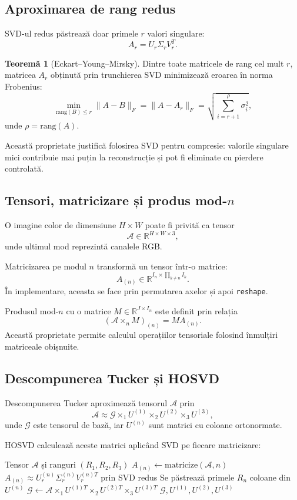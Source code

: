 \documentclass[12pt,a4paper]{article}
\theoremstyle{definition}
\newtheorem{teorema}{Teoremă}[section]
\begin{document}
\subsection{Aproximarea de rang redus}

SVD-ul redus păstrează doar primele $r$ valori singulare:
\[
  A_r = U_r \Sigma_r V_r^T.
\]

\begin{teorema}[Eckart--Young--Mirsky]
Dintre toate matricele de rang cel mult $r$, matricea $A_r$ obținută prin trunchierea SVD minimizează eroarea în norma Frobenius:
\[
  \min_{\mathrm{rang}(B)\le r}\|A-B\|_F
  =
  \|A-A_r\|_F
  =
  \sqrt{\sum_{i=r+1}^{\rho}\sigma_i^2},
\]
unde $\rho=\mathrm{rang}(A)$.
\end{teorema}

Această proprietate justifică folosirea SVD pentru compresie: valorile singulare mici contribuie mai puțin la reconstrucție și pot fi eliminate cu pierdere controlată.

\subsection{Tensori, matricizare și produs mod-$n$}

O imagine color de dimensiune $H \times W$ poate fi privită ca tensor
\[
  \mathcal{A} \in \mathbb{R}^{H \times W \times 3},
\]
unde ultimul mod reprezintă canalele RGB.

Matricizarea pe modul $n$ transformă un tensor într-o matrice:
\[
  A_{(n)} \in \mathbb{R}^{I_n \times \prod_{k\neq n} I_k}.
\]
În implementare, aceasta se face prin permutarea axelor și apoi \texttt{reshape}.

Produsul mod-$n$ cu o matrice $M \in \mathbb{R}^{J \times I_n}$ este definit prin relația
\[
  \left(\mathcal{A}\times_n M\right)_{(n)} = M A_{(n)}.
\]
Această proprietate permite calculul operațiilor tensoriale folosind înmulțiri matriceale obișnuite.

\subsection{Descompunerea Tucker și HOSVD}

Descompunerea Tucker aproximează tensorul $\mathcal{A}$ prin
\[
  \mathcal{A} \approx
  \mathcal{G}
  \times_1 U^{(1)}
  \times_2 U^{(2)}
  \times_3 U^{(3)},
\]
unde $\mathcal{G}$ este tensorul de bază, iar $U^{(n)}$ sunt matrici cu coloane ortonormate.

HOSVD calculează aceste matrici aplicând SVD pe fiecare matricizare:
\begin{algorithm}[H]
\caption{HOSVD}
\begin{algorithmic}[1]
\Require Tensor $\mathcal{A}$ și ranguri $(R_1,R_2,R_3)$
  \State $A_{(n)} \leftarrow \mathrm{matricize}(\mathcal{A}, n)$
  \State $A_{(n)} \approx U_r^{(n)}\Sigma_r^{(n)}V_r^{(n)T}$ prin SVD redus
  \State Se păstrează primele $R_n$ coloane din $U^{(n)}$
\EndFor
\State $\mathcal{G} \leftarrow \mathcal{A}\times_1 U^{(1)T}\times_2 U^{(2)T}\times_3 U^{(3)T}$
\Return $\mathcal{G}, U^{(1)}, U^{(2)}, U^{(3)}$
\end{algorithmic}
\end{algorithm}
\end{document}
